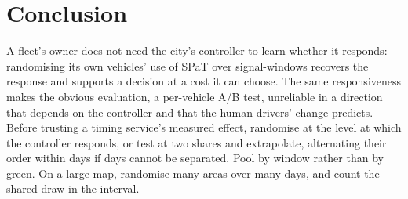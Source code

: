 \section{Conclusion}\label{sec:concl}
A fleet's owner does not need the city's controller to learn whether it responds: randomising its own vehicles' use of SPaT over
signal-windows recovers the response and supports a decision at a cost it can choose. The same responsiveness makes the obvious
evaluation, a per-vehicle A/B test, unreliable in a direction that depends on the controller and that the human drivers' change
predicts. Before trusting a timing service's measured effect, randomise at the level at which the controller responds, or test at two
shares and extrapolate, alternating their order within days if days cannot be separated. Pool by window rather than by green. On a
large map, randomise many areas over many days, and count the shared draw in the interval.

